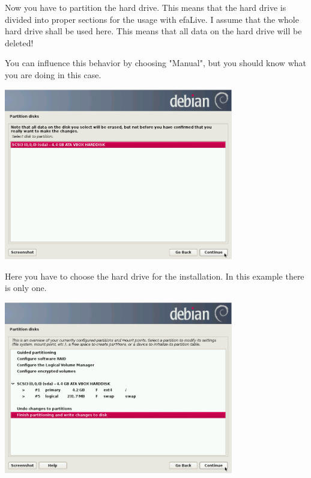\documentclass[a4paper,12pt,twoside]{article}
\begin{document}
Now you have to partition the hard drive. This means that the hard drive
is divided into proper sections for the usage with efaLive. I assume
that the whole hard drive shall be used here. This means that all data
on the hard drive will be deleted!

You can influence this behavior by choosing
"Manual", but you should know what you are
doing in this case.

\begin{minipage}{\linewidth}
    \centering
    \includegraphics[width=10cm]{efaLiveen-img/efaLiveen-img11.png}
    \label{fig:auswahl_festplatte}
\end{minipage}

Here you have to choose the hard drive for the installation. In this
example there is only one.

\begin{minipage}{\linewidth}
    \centering
    \includegraphics[width=10cm]{efaLiveen-img/efaLiveen-img12.png}
    \label{fig:conf_partitioning}
\end{minipage}
\end{document}
